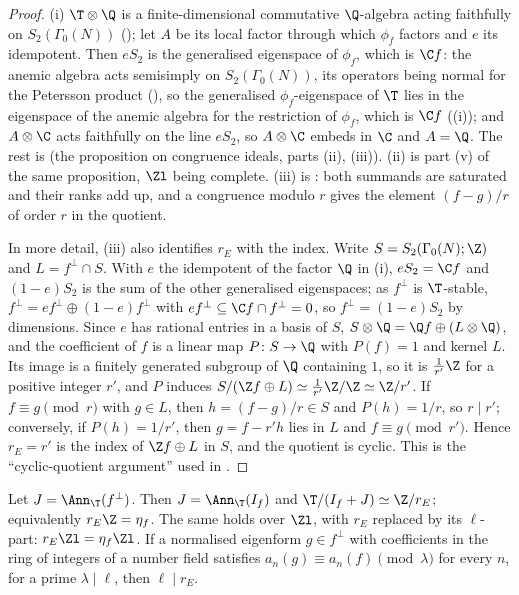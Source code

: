 \begin{proof}
(i) $\T\otimes\Q$ is a finite-dimensional commutative $\Q$-algebra acting faithfully on $S_2(\Gamma_0(N))$ (); let $A$ be its local factor through which
$\phi_f$ factors and $e$ its idempotent. Then $eS_2$ is the generalised eigenspace of $\phi_f$, which is $\C f$: the anemic algebra acts semisimply on $S_2(\Gamma_0(N))$, its operators being normal for
the Petersson product (), so the generalised $\phi_f$-eigenspace of $\T$ lies in the eigenspace of the anemic algebra for the restriction of
$\phi_f$, which is $\C f$ ((i)); and $A\otimes\C$ acts faithfully on the line
$eS_2$, so $A\otimes\C$ embeds in $\C$ and $A=\Q$. The rest is  (the proposition on congruence ideals, parts (ii), (iii)). (ii) is part (v) of the same proposition,
$\Zl$ being complete. (iii) is : both summands are saturated and their ranks add up, and a congruence modulo $r$ gives the element $(f-g)/r$ of order $r$ in the
quotient.

In more detail, (iii) also identifies $r_E$ with the index. Write $S=S_2(\Gamma_0(N);\Z)$ and $L=f^\perp\cap S$. With $e$ the idempotent of the factor $\Q$ in (i), $eS_2=\C f$ and
$(1-e)S_2$ is the sum of the other generalised eigenspaces; as $f^\perp$ is $\T$-stable, $f^\perp=ef^\perp\oplus(1-e)f^\perp$ with $ef^\perp\subseteq\C f\cap f^\perp=0$, so $f^\perp=(1-e)S_2$
by dimensions. Since $e$ has rational entries in a basis of $S$, $S\otimes\Q=\Q f\oplus(L\otimes\Q)$, and the coefficient of $f$ is a linear map $P\colon S\to\Q$ with $P(f)=1$ and kernel $L$. Its
image is a finitely generated subgroup of $\Q$ containing $1$, so it is $\frac1{r'}\Z$ for a positive integer $r'$, and $P$ induces $S/(\Z f\oplus L)\simeq\frac1{r'}\Z/\Z\simeq\Z/r'$. If
$f\equiv g\pmod r$ with $g\in L$, then $h=(f-g)/r\in S$ and $P(h)=1/r$, so $r\mid r'$; conversely, if $P(h)=1/r'$, then $g=f-r'h$ lies in $L$ and $f\equiv g\pmod{r'}$. Hence $r_E=r'$ is
the index of $\Z f\oplus L$ in $S$, and the quotient is cyclic. This is the ``cyclic-quotient argument'' used in .
\end{proof}

\begin{lemma}\label{lem:moddeg:crit}
Let $J=\Ann_\T(f^\perp)$. Then $J=\Ann_\T(I_f)$ and $\T/(I_f+J)\simeq\Z/r_E$; equivalently $r_E\Z=\eta_f$. The same holds over $\Zl$, with $r_E$ replaced by its $\ell$-part:
$r_E\Zl=\eta_f\Zl$. If a normalised eigenform $g\in f^\perp$ with coefficients in the ring of integers of a number field satisfies $a_n(g)\equiv a_n(f)\pmod\lambda$ for every $n$, for a
prime $\lambda\mid\ell$, then $\ell\mid r_E$.
\end{lemma}


